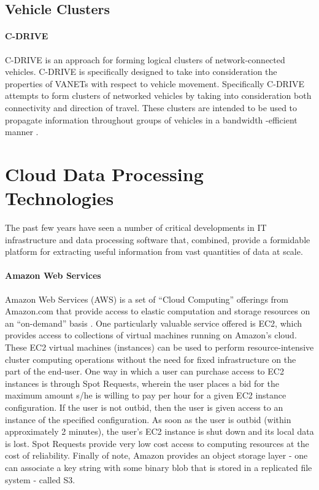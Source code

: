 \documentclass{thesis}
\begin{document}
    \subsection{Vehicle Clusters}
        \paragraph{C-DRIVE}
            C-DRIVE is an approach for forming logical clusters of network-connected vehicles.
            C-DRIVE is specifically designed to take into consideration the properties
            of VANETs with respect to vehicle movement. Specifically C-DRIVE attempts
            to form clusters of networked vehicles by taking into consideration both
            connectivity and direction of travel. These clusters are intended to be
            used to propagate information throughout groups of vehicles in a bandwidth
            -efficient manner \cite{cdrive}.
    \section{Cloud Data Processing Technologies}
        The past few years have seen a number of critical developments in IT
        infrastructure and data processing software that, combined, provide
        a formidable platform for extracting useful information from vast
        quantities of data at scale.
        \paragraph{Amazon Web Services}
            Amazon Web Services (AWS) is a set of ``Cloud Computing'' offerings
            from Amazon.com that provide access to elastic computation and storage
            resources on an ``on-demand'' basis \cite{aws}. One particularly valuable
            service offered is EC2, which provides access to collections of virtual
            machines running on Amazon's cloud. These EC2 virtual machines (instances)
            can be used to perform resource-intensive cluster computing operations without
            the need for fixed infrastructure on the part of the end-user. One way in which
            a user can purchase access to EC2 instances is through Spot Requests, wherein the
            user places a bid for the maximum amount s/he is willing to pay per hour for a given
            EC2 instance configuration. If the user is not outbid, then the user is given access
            to an instance of the specified configuration. As soon as the user is outbid (within
            approximately 2 minutes), the user's EC2 instance is shut down and its local data is
            lost. Spot Requests provide very low cost access to computing resources at the cost of
            reliability.%
            Finally of note, Amazon provides an object storage layer - one can associate a key string
            with some binary blob that is stored in a replicated file system - called S3.
\end{document}
